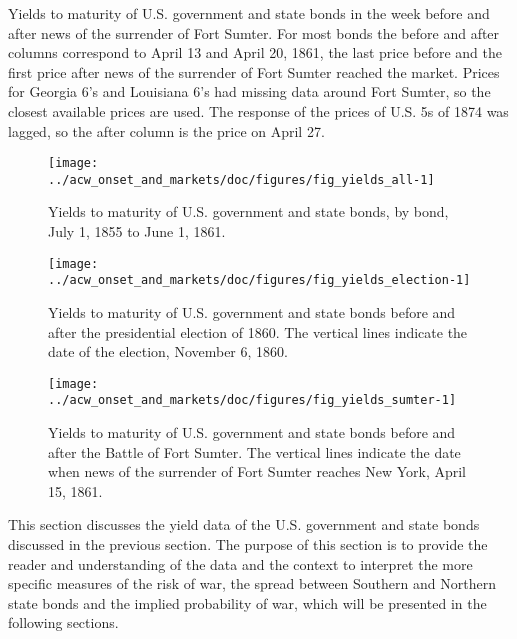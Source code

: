 \begin{table}
  \centering
  

\caption[Yields of U.S. government and state bonds around the Battle of Fort Sumter]{Yields to maturity of U.S. government and state bonds in the week before and after news of the surrender of Fort Sumter.
  For most bonds the before and after columns correspond to April 13 and April 20, 1861, the last price before and the first price after news of the surrender of Fort Sumter reached the market.
  Prices for Georgia 6's and Louisiana 6's had missing data around Fort Sumter, so the closest available prices are used.
  The response of the prices of U.S. 5s of 1874 was lagged, so the after column is the price on April 27.}
\label{acw_onset:tab:sumter}

\end{table}

\begin{figure}
  \centering
  \texttt{[image: ../acw\_onset\_and\_markets/doc/figures/fig\_yields\_all-1]}
\caption[Yields on U.S. government and state bonds, July  1, 1855--June  1, 1861] {Yields to maturity of U.S. government and state bonds, by bond, July  1, 1855 to June  1, 1861.}
\label{acw_onset:fig:yields_all}
\end{figure}


\begin{figure}
  \centering
  \texttt{[image: ../acw\_onset\_and\_markets/doc/figures/fig\_yields\_election-1]}
\caption[Yields on U.S. government and state bonds around the Presidential Election of 1860]{Yields to maturity of U.S. government and state bonds before and after the presidential election of 1860.
  The vertical lines indicate the date of the election, November 6, 1860.}
\label{acw_onset:fig:yields_election}
\end{figure}

\begin{figure}
  \centering
  \texttt{[image: ../acw\_onset\_and\_markets/doc/figures/fig\_yields\_sumter-1]}
\caption[Yields of U.S. government and state bonds around the Battle of Fort Sumter]{Yields to maturity of U.S. government and state bonds before and after the Battle of Fort Sumter. The vertical lines indicate the date when news of the surrender of Fort Sumter reaches New York, April 15, 1861.}
\label{acw_onset:fig:yields_sumter}
\end{figure}

This section discusses the yield data of the U.S. government and state bonds discussed in the previous section.
The purpose of this section is to provide the reader and understanding of the data and the context to interpret the more specific measures of the risk of war, the spread between Southern and Northern state bonds and the implied probability of war, which will be presented in the following sections.

